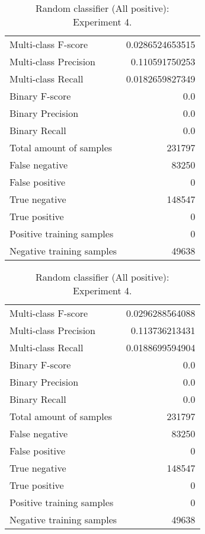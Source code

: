\begin{table}[H]
\begin{minipage}{0.5\textwidth}
\caption{Random classifier (All positive): \\Experiment 3.}
\centering
\begin{tabular}{l r}
\toprule
Multi-class F-score & 0.0286524653515 \\
Multi-class Precision & 0.110591750253 \\
Multi-class Recall & 0.0182659827349 \\
\midrule
Binary F-score & 0.0 \\
Binary Precision & 0.0 \\
Binary Recall & 0.0 \\
\midrule
Total amount of samples & 231797 \\
False negative & 83250 \\
False positive & 0 \\
True negative & 148547 \\
True positive & 0 \\
\midrule
Positive training samples & 0 \\
Negative training samples & 49638 \\
\bottomrule
\end{tabular}
\end{minipage}
\hfillx
\begin{minipage}{0.5\textwidth}
\caption{Random classifier (All positive): \\Experiment 4.}
\centering
\begin{tabular}{l r}
\toprule
Multi-class F-score & 0.0296288564088 \\
Multi-class Precision & 0.113736213431 \\
Multi-class Recall & 0.0188699594904 \\
\midrule
Binary F-score & 0.0 \\
Binary Precision & 0.0 \\
Binary Recall & 0.0 \\
\midrule
Total amount of samples & 231797 \\
False negative & 83250 \\
False positive & 0 \\
True negative & 148547 \\
True positive & 0 \\
\midrule
Positive training samples & 0 \\
Negative training samples & 49638 \\
\bottomrule
\end{tabular}
\end{minipage}
\end{table}
